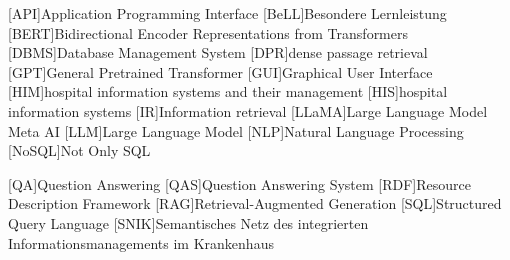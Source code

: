 \begin{acronym}[SPARQL]
[API]{Application Programming Interface}
[BeLL]{Besondere Lernleistung}
[BERT]{Bidirectional Encoder Representations from Transformers}
[DBMS]{Database Management System}
[DPR]{dense passage retrieval}
[GPT]{General Pretrained Transformer}
[GUI]{Graphical User Interface}
[HIM]{hospital information systems and their management}
[HIS]{hospital information systems}
[IR]{Information retrieval}
[LLaMA]{Large Language Model Meta AI}
[LLM]{Large Language Model}
[NLP]{Natural Language Processing}
[NoSQL]{Not Only SQL}

[QA]{Question Answering}
[QAS]{Question Answering System}
[RDF]{Resource Description Framework}
[RAG]{Retrieval-Augmented Generation}
[SQL]{Structured Query Language}
[SNIK]{Semantisches Netz des integrierten Informationsmanagements im Krankenhaus}
\end{acronym}
